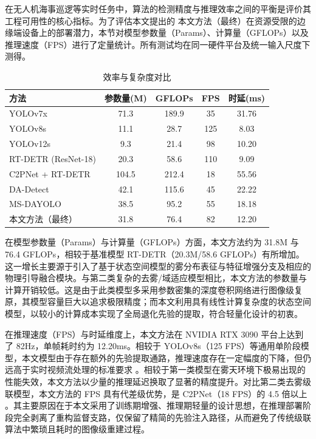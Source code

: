 在无人机海事巡逻等实时任务中，算法的检测精度与推理效率之间的平衡是评价其工程可用性的核心指标。为了评估本文提出的 本文方法（最终）在资源受限的边缘端设备上的部署潜力，本节对模型参数量（Params）、计算量（GFLOPs）以及推理速度（FPS）进行了定量统计。所有测试均在同一硬件平台及统一输入尺度下测得。

\begin{table}[!htbp]
\centering
\caption{效率与复杂度对比}
\label{tab:efficiency_cmp}
\begin{tabular}{l c c c c}
\hline
方法 & 参数量(M) & GFLOPs & FPS & 时延(ms) \\
\hline
YOLOv7x & 71.3 & 189.9 & 35 & 31.76 \\
YOLOv8s & 11.1 & 28.7 & 125 & 8.03 \\
YOLOv12s & 9.3 & 21.4 & 98 & 10.20 \\
RT-DETR (ResNet-18) & 20.3 & 58.6 & 110 & 9.09 \\
C2PNet + RT-DETR & 104.5 & 212.4 & 18 & 55.56 \\
DA-Detect & 42.1 & 115.6 & 45 & 22.22 \\
MS-DAYOLO & 38.5 & 95.2 & 55 & 18.18 \\
本文方法（最终） & 31.8 & 76.4 & 82 & 12.20 \\
\hline
\end{tabular}
\end{table}

在模型参数量（Params）与计算量（GFLOPs）方面，本文方法约为 31.8M 与 76.4 GFLOPs，相较于基准模型 RT-DETR（20.3M/58.6 GFLOPs）有所增加。这一增长主要源于引入了基于状态空间模型的雾分布表征与特征增强分支及相应的物理引导融合模块。与第二类复杂的去雾/域适应模型相比，本文方法的参数量与计算开销较低。这是由于此类模型多采用参数密集的深度卷积网络进行图像级复原，其模型容量巨大以追求极限精度；而本文利用具有线性计算复杂度的状态空间模型，以较小的计算成本实现了全局退化先验的提取，符合轻量化设计的初衷。

在推理速度（FPS）与时延维度上，本文方法在 NVIDIA RTX 3090 平台上达到了 82Hz，单帧耗时约为 12.20ms。相较于 YOLOv8s（125 FPS）等通用单阶段模型，本文模型由于存在额外的先验提取通路，推理速度存在一定幅度的下降，但仍远高于实时视频流处理的标准要求 。相较于第一类模型在雾天环境下极易出现的性能失效，本文方法以少量的推理延迟换取了显著的精度提升。对比第二类去雾级联模型，本文方法的 FPS 具有代差级优势，是 C2PNet（18 FPS）的 4.5 倍以上 。其主要原因在于本文采用了训练期增强、推理期轻量的设计思想，在推理部署阶段完全剥离了重构监督支路，仅保留了精简的先验注入路径，从而避免了传统级联算法中繁琐且耗时的图像级重建过程。

